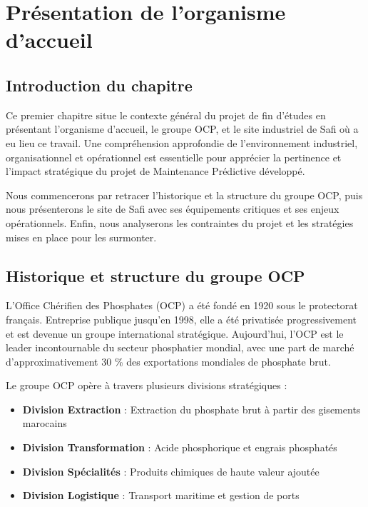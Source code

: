 \documentclass[a4paper,12pt,twoside]{report}
\begin{document}
\chapter{Présentation de l'organisme d'accueil}

\section*{Introduction du chapitre}

Ce premier chapitre situe le contexte général du projet de fin d'études en présentant l'organisme d'accueil, le groupe OCP, et le site industriel de Safi où a eu lieu ce travail. Une compréhension approfondie de l'environnement industriel, organisationnel et opérationnel est essentielle pour apprécier la pertinence et l'impact stratégique du projet de Maintenance Prédictive développé.

Nous commencerons par retracer l'historique et la structure du groupe OCP, puis nous présenterons le site de Safi avec ses équipements critiques et ses enjeux opérationnels. Enfin, nous analyserons les contraintes du projet et les stratégies mises en place pour les surmonter.

\section{Historique et structure du groupe OCP}

L'Office Chérifien des Phosphates (OCP) a été fondé en 1920 sous le protectorat français. Entreprise publique jusqu'en 1998, elle a été privatisée progressivement et est devenue un groupe international stratégique. Aujourd'hui, l'OCP est le leader incontournable du secteur phosphatier mondial, avec une part de marché d'approximativement 30 \% des exportations mondiales de phosphate brut.

Le groupe OCP opère à travers plusieurs divisions stratégiques :
\begin{itemize}
    \item \textbf{Division Extraction} : Extraction du phosphate brut à partir des gisements marocains
    \item \textbf{Division Transformation} : Acide phosphorique et engrais phosphatés
    \item \textbf{Division Spécialités} : Produits chimiques de haute valeur ajoutée
    \item \textbf{Division Logistique} : Transport maritime et gestion de ports
\end{itemize}
\end{document}
